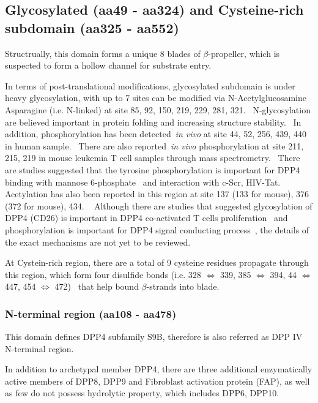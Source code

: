 \subsection{Glycosylated (aa49 - aa324) and Cysteine-rich subdomain (aa325 - aa552)}

Structrually, this domain forms a unique 8 blades of $\beta$-propeller, which is suspected to form a hollow channel for substrate entry.

In terms of post-translational modifications, glycosylated subdomain is under heavy glycosylation, with up to 7 sites can be modified via N-Acetylglucosamine Asparagine (i.e. N-linked) at site 85, 92, 150, 219, 229, 281, 321.~\cite{Rasmussen2003,Thoma2003,Meng2010,Chen2009,Hiramatsu2003} N-glycosylation are believed important in protein folding and increasing structure stability.~\cite{Fan_1997} In addition, phosphorylation has been detected~\textit{in vivo} at site 44, 52, 256, 439, 440 in human sample.~\cite{Xia2008, Hornbeck2015, Mertins2014} There are also reported~\textit{in vivo} phosphorylation at site 211, 215, 219 in mouse leukemia T cell samples through mass spectrometry.~\cite{Hornbeck2015} There are studies suggested that the tyrosine phosphorylation is important for DPP4 binding with mannose 6-phosphate~\cite{Ikushima_2000} and interaction with c-Scr, HIV-Tat.~\cite{Bilodeau_2006,Fan_2012}
Acetylation has also been reported in this region at site 137 (133 for mouse), 376 (372 for mouse), 434. ~\cite{Lundby2012,Weinert2013} Although there are studies that suggested glycosylation of DPP4 (CD26) is important in DPP4 co-activated T cells proliferation~\cite{Ikushima_2000} and phosphorylation is important for DPP4 signal conducting process~\cite{Ishii_2001}, the details of the exact mechanisms are not yet to be reviewed.
\par
At Cystein-rich region, there are a total of 9 cysteine residues propagate through this region, which form four disulfide bonds (i.e. 328 $\Leftrightarrow$ 339, 385 $\Leftrightarrow$ 394, 44 $\Leftrightarrow$ 447, 454 $\Leftrightarrow$ 472)~\cite{Hiramatsu2003} that help bound $\beta$-strands into blade. 

\subsubsection{N-terminal region (aa108 - aa478)}

This domain defines DPP4 subfamily S9B, therefore is also referred as DPP IV N-terminal region.
\par 
In addition to archetypal member DPP4, there are three additional enzymatically active members of DPP8, DPP9 and Fibroblast activation protein (FAP), as well as few do not possess hydrolytic property, which includes DPP6, DPP10. 

